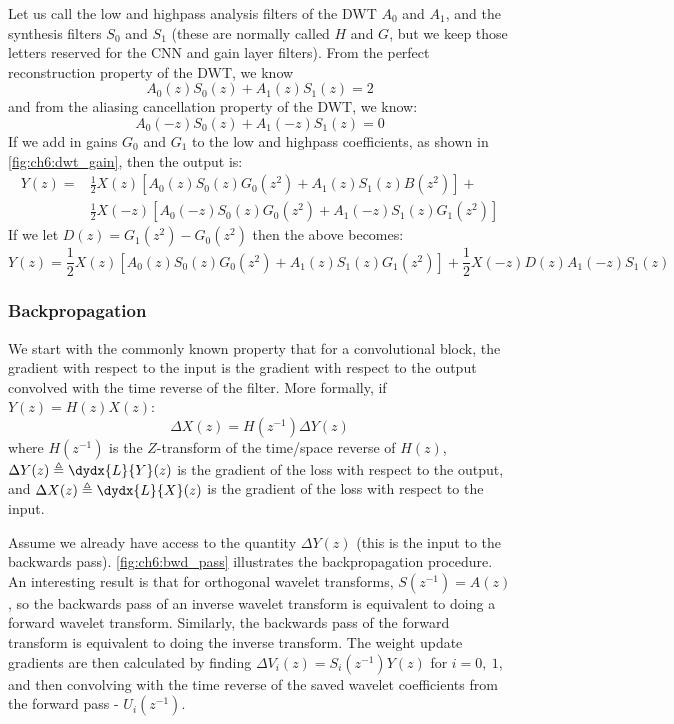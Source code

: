 Let us call the low and highpass analysis filters of the DWT $A_0$ and $A_1$,
and the synthesis filters $S_0$ and $S_1$ (these are normally called $H$ and
$G$, but we keep those letters reserved for the CNN and gain layer filters). 
From the perfect reconstruction property of the DWT, we know 
\begin{equation}
  A_0(z)S_0(z) + A_1(z)S_1(z) = 2
\end{equation}
and from the aliasing cancellation property of the DWT, we know:
\begin{equation}
  A_0(-z)S_0(z) + A_1(-z)S_1(z) = 0
\end{equation}
%
If we add in gains $G_0$ and $G_1$ to the low and highpass coefficients, as
shown in \autoref{fig:ch6:dwt_gain}, then the output is:
\begin{equation}
  \begin{split}
   Y(z) =& \frac{1}{2} X(z) \left[A_0(z)S_0(z)G_0(z^2) + A_1(z)S_1(z)B(z^2) \right] + \\
         & \frac{1}{2}X(-z) \left[A_0(-z)S_0(z)G_0(z^2) + A_1(-z)S_1(z)G_1(z^2) \right]
\end{split}
\end{equation}
If we let $D(z) = G_1(z^2) - G_0(z^2)$ then the above becomes:
\begin{equation}
  Y(z) = \frac{1}{2} X(z) \left[A_0(z)S_0(z)G_0(z^2) + A_1(z)S_1(z)G_1(z^2) \right] + 
         \frac{1}{2}X(-z)D(z)A_1(-z)S_1(z) \label{eq:ch6:dwt_fwd}
\end{equation}

\subsubsection{Backpropagation}\label{sec:ch6:dwt_update}
We start with the commonly known property that for a convolutional block, the
gradient with respect to the input is the gradient with respect to the output
convolved with the time reverse of the filter. More formally, if 
$Y(z) = H(z) X(z)$:
%
\begin{equation}\label{eq:ch6:backprop}
  \Delta X(z) = H(z^{-1}) \Delta Y(z)
\end{equation}
%
where $H(z^{-1})$ is the $Z$-transform of the time/space reverse of $H(z)$,
$\Delta Y(z) \triangleq \dydx{L}{Y}(z)$ is the gradient of the loss with respect
to the output, and $\Delta X(z) \triangleq \dydx{L}{X}(z)$ is the gradient of
the loss with respect to the input. 

Assume we already have access to the quantity $\Delta Y(z)$ (this is the input
to the backwards pass). \autoref{fig:ch6:bwd_pass} illustrates the
backpropagation procedure. An interesting result is that for orthogonal wavelet
transforms, $S(z^{-1}) = A(z)$, so the backwards pass of an inverse wavelet
transform is equivalent to doing a forward wavelet transform. Similarly, the
backwards pass of the forward transform is equivalent to doing the inverse
transform. The weight update gradients are then calculated by finding 
$\Delta V_i(z) = S_i(z^{-1})Y(z)$ for $i=0,\ 1$, and then convolving with the
time reverse of the saved wavelet coefficients from the forward pass -
$U_i(z^{-1})$.

